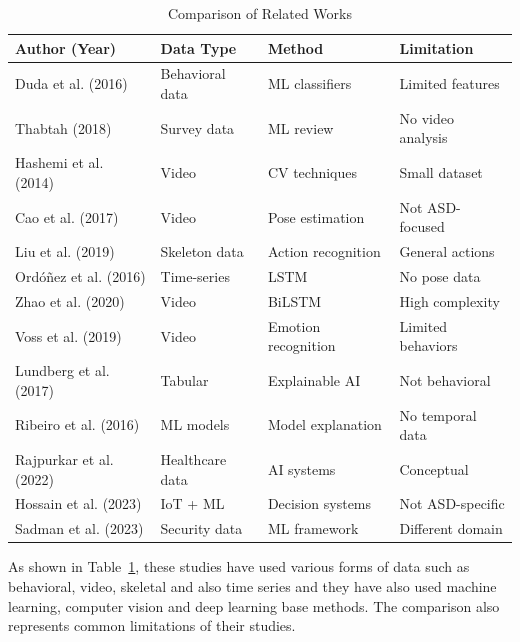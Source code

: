 \begin{table}[h]
\centering
\caption{Comparison of Related Works}
\label{tab:related_works}
\begin{tabular}{|p{3cm}|p{3cm}|p{3cm}|p{3cm}|}
\hline
\textbf{Author (Year)} & \textbf{Data Type} & \textbf{Method} & \textbf{Limitation} \\ \hline
Duda et al. (2016) \cite{duda2016use} & Behavioral data & ML classifiers & Limited features \\ \hline
Thabtah (2018) \cite{thabtah2018machine} & Survey data & ML review & No video analysis \\ \hline
Hashemi et al. (2014) \cite{hashemi2014computer} & Video & CV techniques & Small dataset \\ \hline
Cao et al. (2017) \cite{cao2017realtime} & Video & Pose estimation & Not ASD-focused \\ \hline
Liu et al. (2019) \cite{liu2019skeleton} & Skeleton data & Action recognition & General actions \\ \hline
Ord\'{o}\~{n}ez et al. (2016) \cite{ordonez2016deep} & Time-series & LSTM & No pose data \\ \hline
Zhao et al. (2020) \cite{zhao2020bidirectional} & Video & BiLSTM & High complexity \\ \hline
Voss et al. (2019) \cite{voss2019emotion} & Video & Emotion recognition & Limited behaviors \\ \hline
Lundberg et al. (2017) \cite{lundberg2017unified} & Tabular & Explainable AI & Not behavioral \\ \hline
Ribeiro et al. (2016) \cite{ribeiro2016should} & ML models & Model explanation & No temporal data \\ \hline
Rajpurkar et al. (2022) \cite{rajpurkar2022ai} & Healthcare data & AI systems & Conceptual \\ \hline
Hossain et al. (2023) \cite{hossain2023smart} & IoT + ML & Decision systems & Not ASD-specific \\ \hline
Sadman et al. (2023) \cite{sadman2023password} & Security data & ML framework & Different domain \\ \hline
\end{tabular}
\end{table}
As shown in Table~\ref{tab:related_works}, these studies have used various forms of data such as behavioral, video, skeletal and also time series and they have also used machine learning, computer vision and deep learning base methods. The comparison also represents common limitations of their studies.


